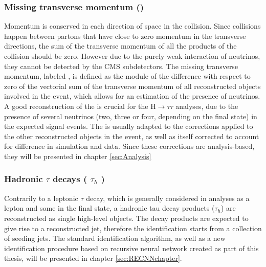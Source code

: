 \subsubsection{Missing transverse momentum (\MET)}
Momentum is conserved in each direction of space in the collision. Since collisions happen between partons that have close to zero momentum in the transverse directions, the sum of the transverse momentum of all the products of the collision should be zero. However due to the purely weak interaction of neutrinos, they cannot be detected by the CMS subdetectors. The missing transverse momentum, labeled \ETm, is defined as the module of the difference with respect to zero of the vectorial sum of the transverse momentum of all reconstructed objects involved in the event, which allows for an estimation of the presence of neutrinos. A good reconstruction of the \ETm is crucial for the H$\rightarrow\tau\tau$ analyses, due to the presence of several neutrinos (two, three or four, depending on the final state) in the expected signal events. The \ETm is usually adapted to the corrections applied to the other reconstructed objects in the event, as well as itself corrected to account for difference in simulation and data. Since these corrections are analysis-based, they will be presented in chapter \ref{sec:Analysis}

\subsubsection{Hadronic $\tau$ decays ( $\tau_{h}$ )}
Contrarily to a leptonic $\tau$ decay, which is generally considered in analyses as a lepton and some \ETm in the final state, a hadronic tau decay products ($\tau_{h}$) are reconstructed as single high-level objects. The \tauh decay products are expected to give rise to a reconstructed jet, therefore the \tauh identification starts from a collection of seeding jets. The standard \tauh identification algorithm, as well as a new identification procedure based on recursive neural network created as part of this thesis, will be presented in chapter \ref{sec:RECNNchapter}.
